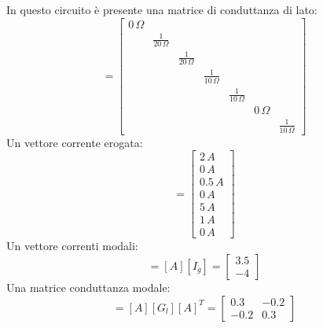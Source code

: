 \documentclass{article}
\numberwithin{equation}{subsection}
\begin{document}
In questo circuito è presente una matrice di conduttanza di lato:
\begin{equation*}
    [G_l]=\begin{bmatrix}
        0\,\Omega&&&&&&\\
        &\displaystyle\frac{1}{20\,\Omega}&&&&&\\
        &&\displaystyle\frac{1}{20\,\Omega}&&&&\\
        &&&\displaystyle\frac{1}{10\,\Omega}&&&\\
        &&&&\displaystyle\frac{1}{10\,\Omega}&&\\
        &&&&&0\,\Omega&\\
        &&&&&&\displaystyle\frac{1}{10\,\Omega}
    \end{bmatrix}
\end{equation*}
Un vettore corrente erogata:
\begin{equation*}
    [I_g]=\begin{bmatrix}
        2\,A\\
        0\,A\\
        0.5\,A\\
        0\,A\\
        5\,A\\
        1\,A\\
        0\,A
    \end{bmatrix}
\end{equation*}
Un vettore correnti modali:
\begin{equation*}
    [I_{mo}]=[A][I_g]=\begin{bmatrix}
        3.5\\
        -4
    \end{bmatrix}
\end{equation*}
Una matrice conduttanza modale:
\begin{equation*}
    [G_{mo}]=[A][G_l][A]^T=\begin{bmatrix}
        0.3&-0.2\\
        -0.2&0.3
    \end{bmatrix}
\end{equation*}
\end{document}
